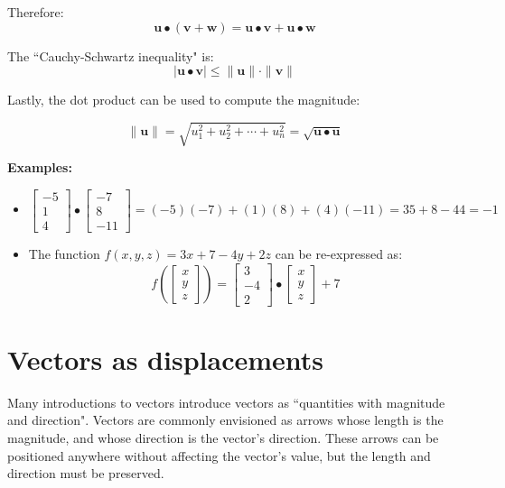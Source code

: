 \documentclass{article}
\begin{document}
Therefore:
\[\mathbf{u} \bullet (\mathbf{v} + \mathbf{w}) = \mathbf{u} \bullet \mathbf{v} + \mathbf{u} \bullet \mathbf{w}\]


The ``Cauchy-Schwartz inequality" is:
\[|\mathbf{u} \bullet \mathbf{v}| \leq \|\mathbf{u}\|\cdot\|\mathbf{v}\|\]





Lastly, the dot product can be used to compute the magnitude:

\[\|\mathbf{u}\| = \sqrt{u_1^2 + u_2^2 + \cdots + u_n^2} = \sqrt{\mathbf{u} \bullet \mathbf{u}}\]

\textbf{Examples:}
\begin{itemize}
\item 
\[\begin{bmatrix} -5 \\ 1 \\ 4 \end{bmatrix} \bullet \begin{bmatrix} -7 \\ 8 \\ -11 \end{bmatrix} = (-5)(-7) + (1)(8) + (4)(-11) = 35 + 8 - 44 = -1\]
\item The function \(f(x, y, z) = 3x + 7 - 4y + 2z\) can be re-expressed as:
\[f\left(\begin{bmatrix} x \\ y \\ z \end{bmatrix}\right) = \begin{bmatrix} 3 \\ -4 \\ 2 \end{bmatrix} \bullet \begin{bmatrix} x \\ y \\ z \end{bmatrix} + 7 \]
\end{itemize}







\section*{Vectors as displacements}

Many introductions to vectors introduce vectors as ``quantities with magnitude and direction". Vectors are commonly envisioned as arrows whose length is the magnitude, and whose direction is the vector's direction. These arrows can be positioned anywhere without affecting the vector's value, but the length and direction must be preserved. 
\end{document}
